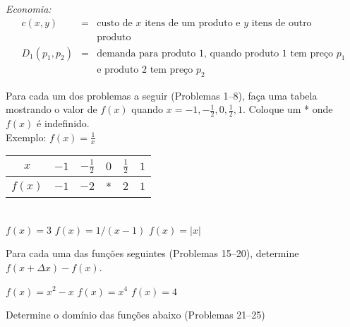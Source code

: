 \documentclass{svmono}
\begin{document}
\emph{Economia:}
\begin{eqnarray*}
 c(x,y) & = & \text{custo de $x$ itens de um produto e $y$ itens de outro} \\
        &   & \text{produto} \\
 D_1(p_1,p_2) & = & \text{demanda para produto 1, quando produto 1 tem preço $p_1$}\\
              &   & \text{e produto 2 tem preço $p_2$}
\end{eqnarray*}

\begin{sectionproblems}

Para cada um dos problemas a seguir (Problemas 1--8), faça uma tabela
mostrando o valor de $f(x)$ quando $x = -1, -\frac{1}{2}, 0, \frac{1}{2}, 1$.
Coloque um * onde $f(x)$ é indefinido.\\

Exemplo:
$\displaystyle f(x) = \frac{1}{x}$%
\SPC\SPC\SPC%
\begin{tabular}{c @{\SPC} | @{\SPC} c @{\SPC} c @{\SPC} c @{\SPC} c @{\SPC} c}
   $x$ & $-1$ & $-\frac{1}{2}$ & $0$ & $\frac{1}{2}$ & $1$ \\
\hline
$f(x)$ & $-1$ &     $-2$       &  *  &      $2$      & $1$
\end{tabular}\\

%
        {$f(x) = 3$}
%
        {$f(x) = 1/(x-1)$}
%
        {$f(x) = |x|$}

Para cada uma das funções seguintes (Problemas 15--20), determine
$f(x + \Delta x) - f(x)$.

%
        {$f(x) = x^2 - x$}
%
        {$f(x) = x^4$}
%
        {$f(x) = 4$}

Determine o domínio das funções abaixo (Problemas 21--25)


\end{sectionproblems}
\end{document}
